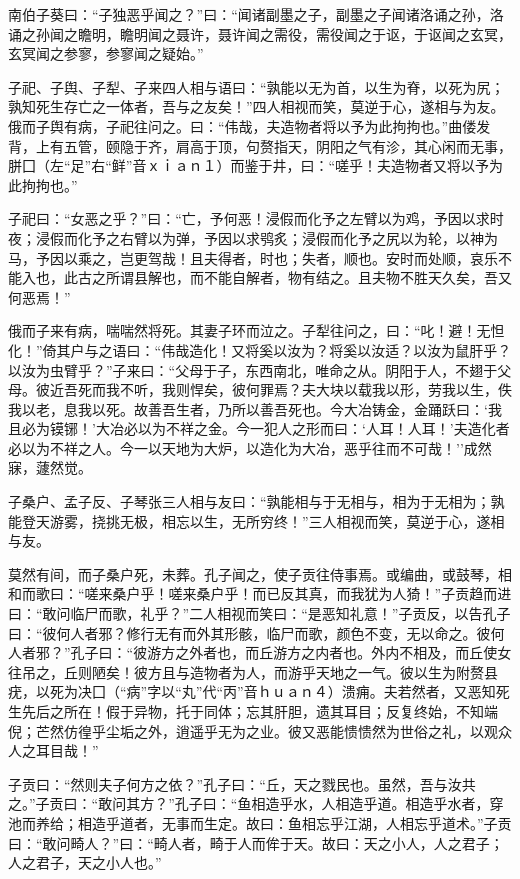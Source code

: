 \documentclass[]{article}
\begin{document}
南伯子葵曰：``子独恶乎闻之？''曰：``闻诸副墨之子，副墨之子闻诸洛诵之孙，洛诵之孙闻之瞻明，瞻明闻之聂许，聂许闻之需役，需役闻之于讴，于讴闻之玄冥，玄冥闻之参寥，参寥闻之疑始。''

子祀、子舆、子犁、子来四人相与语曰：``孰能以无为首，以生为脊，以死为尻；孰知死生存亡之一体者，吾与之友矣！''四人相视而笑，莫逆于心，遂相与为友。俄而子舆有病，子祀往问之。曰：``伟哉，夫造物者将以予为此拘拘也。''曲偻发背，上有五管，颐隐于齐，肩高于顶，句赘指天，阴阳之气有沴，其心闲而无事，胼囗（左``足''右``鲜''音ｘｉａｎ１）而鉴于井，曰：``嗟乎！夫造物者又将以予为此拘拘也。''

子祀曰：``女恶之乎？''曰：``亡，予何恶！浸假而化予之左臂以为鸡，予因以求时夜；浸假而化予之右臂以为弹，予因以求鸮炙；浸假而化予之尻以为轮，以神为马，予因以乘之，岂更驾哉！且夫得者，时也；失者，顺也。安时而处顺，哀乐不能入也，此古之所谓县解也，而不能自解者，物有结之。且夫物不胜天久矣，吾又何恶焉！''

俄而子来有病，喘喘然将死。其妻子环而泣之。子犁往问之，曰：``叱！避！无怛化！''倚其户与之语曰：``伟哉造化！又将奚以汝为？将奚以汝适？以汝为鼠肝乎？以汝为虫臂乎？''子来曰：``父母于子，东西南北，唯命之从。阴阳于人，不翅于父母。彼近吾死而我不听，我则悍矣，彼何罪焉？夫大块以载我以形，劳我以生，佚我以老，息我以死。故善吾生者，乃所以善吾死也。今大冶铸金，金踊跃曰：`我且必为镆铘！'大冶必以为不祥之金。今一犯人之形而曰：`人耳！人耳！'夫造化者必以为不祥之人。今一以天地为大炉，以造化为大冶，恶乎往而不可哉！''成然寐，蘧然觉。

子桑户、孟子反、子琴张三人相与友曰：``孰能相与于无相与，相为于无相为；孰能登天游雾，挠挑无极，相忘以生，无所穷终！''三人相视而笑，莫逆于心，遂相与友。

莫然有间，而子桑户死，未葬。孔子闻之，使子贡往侍事焉。或编曲，或鼓琴，相和而歌曰：``嗟来桑户乎！嗟来桑户乎！而已反其真，而我犹为人猗！''子贡趋而进曰：``敢问临尸而歌，礼乎？''二人相视而笑曰：``是恶知礼意！''子贡反，以告孔子曰：``彼何人者邪？修行无有而外其形骸，临尸而歌，颜色不变，无以命之。彼何人者邪？''孔子曰：``彼游方之外者也，而丘游方之内者也。外内不相及，而丘使女往吊之，丘则陋矣！彼方且与造物者为人，而游乎天地之一气。彼以生为附赘县疣，以死为决囗（``病''字以``丸''代``丙''音ｈｕａｎ４）溃痈。夫若然者，又恶知死生先后之所在！假于异物，托于同体；忘其肝胆，遗其耳目；反复终始，不知端倪；芒然仿徨乎尘垢之外，逍遥乎无为之业。彼又恶能愦愦然为世俗之礼，以观众人之耳目哉！''

子贡曰：``然则夫子何方之依？''孔子曰：``丘，天之戮民也。虽然，吾与汝共之。''子贡曰：``敢问其方？''孔子曰：``鱼相造乎水，人相造乎道。相造乎水者，穿池而养给；相造乎道者，无事而生定。故曰：鱼相忘乎江湖，人相忘乎道术。''子贡曰：``敢问畸人？''曰：``畸人者，畸于人而侔于天。故曰：天之小人，人之君子；人之君子，天之小人也。''
\end{document}
